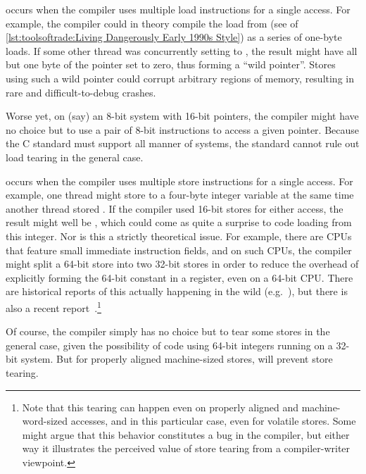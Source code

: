 \begin{description}[labelsep=.4em]
\item[Load tearing] occurs when the compiler uses multiple load
instructions for a single access.
For example, the compiler could in theory compile the load from
 (see
 of
\cref{lst:toolsoftrade:Living Dangerously Early 1990s Style})
as a series of one-byte loads.
If some other thread was concurrently setting  to
, the result might have all but one byte of the pointer
set to zero, thus forming a ``wild pointer''.
Stores using such a wild pointer could corrupt arbitrary
regions of memory, resulting in rare and difficult-to-debug crashes.

Worse yet, on (say) an 8-bit system with 16-bit pointers, the compiler
might have no choice but to use a pair of 8-bit instructions to access
a given pointer.
Because the C standard must support all manner of systems, the standard
cannot rule out load tearing in the general case.

\item[Store tearing] occurs when the compiler uses multiple store
instructions for a single access.
For example, one thread might store  to a four-byte integer
variable at the same time another thread stored .
If the compiler used 16-bit stores for either access, the result
might well be , which could come as quite a surprise to
code loading from this integer.
Nor is this a strictly theoretical issue.
For example, there are CPUs that feature small immediate instruction
fields, and on such CPUs, the compiler might split a 64-bit store into
two 32-bit stores in order to reduce the overhead of explicitly forming
the 64-bit constant in a register, even on a 64-bit CPU\@.
There are historical reports of this actually happening in
the wild (e.g.~\cite{KonstantinKhlebnikov2013gccstoretearing}),
but there is also a recent
report~\cite{WillDeacon2019StoreTearingReport}.\footnote{
	Note that this tearing can happen even on properly aligned
	and machine-word-sized accesses, and in this particular case,
	even for volatile stores.
	Some might argue that this behavior constitutes a bug in the
	compiler, but either way it illustrates the perceived value of
	store tearing from a compiler-writer viewpoint.
}

Of course, the compiler simply has no choice but to tear some stores
in the general case, given
the possibility of code using 64-bit integers running on a 32-bit system.
But for properly aligned machine-sized stores,  will
prevent store tearing.


\end{description}
